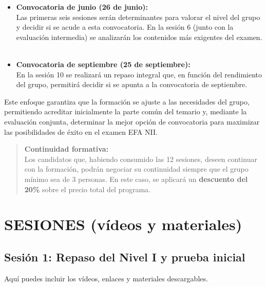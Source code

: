 \documentclass[
  letterpaper,
  DIV=11,
  numbers=noendperiod]{scrreprt}
\begin{document}
\begin{itemize}
\item
  \textbf{Convocatoria de junio (26 de junio):}\\
  Las primeras seis sesiones serán determinantes para valorar el nivel
  del grupo y decidir si se acude a esta convocatoria. En la sesión 6
  (junto con la evaluación intermedia) se analizarán los contenidos más
  exigentes del examen. 🚀
\item
  \textbf{Convocatoria de septiembre (25 de septiembre):}\\
  En la sesión 10 se realizará un repaso integral que, en función del
  rendimiento del grupo, permitirá decidir si se apunta a la
  convocatoria de septiembre. 📆
\end{itemize}

Este enfoque garantiza que la formación se ajuste a las necesidades del
grupo, permitiendo acreditar inicialmente la parte común del temario y,
mediante la evaluación conjunta, determinar la mejor opción de
convocatoria para maximizar las posibilidades de éxito en el examen EFA
NII.

\begin{quote}
\textbf{Continuidad formativa:}\\
Los candidatos que, habiendo consumido las 12 sesiones, deseen continuar
con la formación, podrán negociar su continuidad siempre que el grupo
mínimo sea de 3 personas. En este caso, se aplicará un \textbf{descuento
del 20\%} sobre el precio total del programa. 💼🎉
\end{quote}

\part{SESIONES (vídeos y materiales)}

\chapter{Sesión 1: Repaso del Nivel I y prueba
inicial}\label{sesiuxf3n-1-repaso-del-nivel-i-y-prueba-inicial}

\begin{tcolorbox}[enhanced jigsaw, leftrule=.75mm, breakable, opacitybacktitle=0.6, coltitle=black, rightrule=.15mm, colframe=quarto-callout-note-color-frame, titlerule=0mm, toprule=.15mm, colback=white, arc=.35mm, title=\textcolor{quarto-callout-note-color}{\faInfo}\hspace{0.5em}{Material de la sesión}, toptitle=1mm, bottomrule=.15mm, colbacktitle=quarto-callout-note-color!10!white, left=2mm, opacityback=0, bottomtitle=1mm]

Aquí puedes incluir los vídeos, enlaces y materiales descargables.

\end{tcolorbox}
\end{document}
